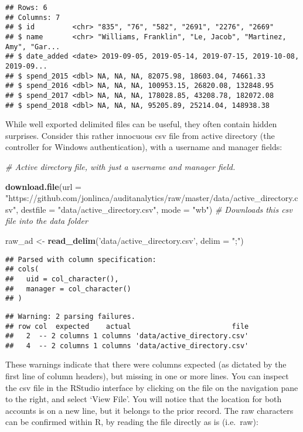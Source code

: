 \documentclass[
]{book}
\newenvironment{Shaded}{\begin{snugshade}}{\end{snugshade}}
\newcommand{\CommentTok}[1]{\textcolor[rgb]{0.56,0.35,0.01}{\textit{#1}}}
\newcommand{\DataTypeTok}[1]{\textcolor[rgb]{0.13,0.29,0.53}{#1}}
\newcommand{\KeywordTok}[1]{\textcolor[rgb]{0.13,0.29,0.53}{\textbf{#1}}}
\newcommand{\NormalTok}[1]{#1}
\newcommand{\StringTok}[1]{\textcolor[rgb]{0.31,0.60,0.02}{#1}}
\begin{document}
\begin{verbatim}
## Rows: 6
## Columns: 7
## $ id         <chr> "835", "76", "582", "2691", "2276", "2669"
## $ name       <chr> "Williams, Franklin", "Le, Jacob", "Martinez, Amy", "Gar...
## $ date_added <date> 2019-09-05, 2019-05-14, 2019-07-15, 2019-10-08, 2019-09...
## $ spend_2015 <dbl> NA, NA, NA, 82075.98, 18603.04, 74661.33
## $ spend_2016 <dbl> NA, NA, NA, 100953.15, 26820.08, 132848.95
## $ spend_2017 <dbl> NA, NA, NA, 178028.85, 43208.78, 182072.08
## $ spend_2018 <dbl> NA, NA, NA, 95205.89, 25214.04, 148938.38
\end{verbatim}

While well exported delimited files can be useful, they often contain hidden surprises. Consider this rather innocuous csv file from active directory (the controller for Windows authentication), with a username and manager fields:

\begin{Shaded}
\begin{Highlighting}[]
\CommentTok{# Active directory file, with just a username and manager field.}

\KeywordTok{download.file}\NormalTok{(}\DataTypeTok{url =} \StringTok{"https://github.com/jonlinca/auditanalytics/raw/master/data/active_directory.csv"}\NormalTok{,}
              \DataTypeTok{destfile =} \StringTok{"data/active_directory.csv"}\NormalTok{, }\DataTypeTok{mode =} \StringTok{"wb"}\NormalTok{) }\CommentTok{# Downloads this csv file into the data folder}

\NormalTok{raw_ad <-}\StringTok{ }\KeywordTok{read_delim}\NormalTok{(}\StringTok{'data/active_directory.csv'}\NormalTok{, }\DataTypeTok{delim =} \StringTok{";"}\NormalTok{)}
\end{Highlighting}
\end{Shaded}

\begin{verbatim}
## Parsed with column specification:
## cols(
##   uid = col_character(),
##   manager = col_character()
## )
\end{verbatim}

\begin{verbatim}
## Warning: 2 parsing failures.
## row col  expected    actual                        file
##   2  -- 2 columns 1 columns 'data/active_directory.csv'
##   4  -- 2 columns 1 columns 'data/active_directory.csv'
\end{verbatim}

These warnings indicate that there were columns expected (as dictated by the first line of column headers), but missing in one or more lines. You can inspect the csv file in the RStudio interface by clicking on the file on the navigation pane to the right, and select `View File'. You will notice that the location for both accounts is on a new line, but it belongs to the prior record. The raw characters can be confirmed within R, by reading the file directly as is (i.e.~raw):
\end{document}
